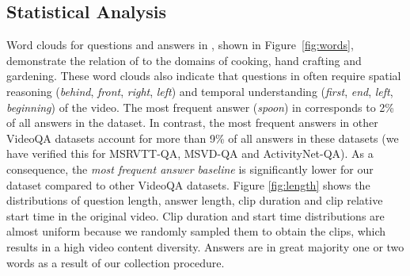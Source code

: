 \begin{table*}[t]
\centering
\setlength\tabcolsep{7pt}
\vspace{-0.3cm}
\caption{\small Results of our \textit{\vqat{}} model with different training strategies, on subsets of MSRVTT-QA, MSVD-QA and ActivityNet-QA, corresponding to four quartiles with Q1 and Q4 corresponding to samples with the most frequent and the least frequent answers, respectively.}
\vspace{-0.5cm}
\label{table:rareall}
\end{table*}


\subsection{Statistical Analysis}
Word clouds for questions and answers in \smalldatasetname{}, shown in Figure~\ref{fig:words}, demonstrate the relation of \smalldatasetname{} to the domains of cooking, hand crafting and gardening.
These word clouds also indicate that questions in \smalldatasetname{} often require spatial reasoning (\textit{behind}, \textit{front}, \textit{right}, \textit{left}) and temporal understanding (\textit{first}, \textit{end}, \textit{left}, \textit{beginning}) of the video. 
The most frequent answer (\textit{spoon}) in \smalldatasetname{} corresponds to 2\% of all answers in the dataset. 
In contrast, the most frequent answers in other VideoQA datasets account for more than 9\% of all answers in these datasets (we have verified this for MSRVTT-QA, MSVD-QA and ActivityNet-QA). 
As a consequence, the \textit{most frequent answer baseline} is significantly lower for our \smalldatasetname{} dataset compared to other VideoQA datasets.
Figure \ref{fig:length} shows the distributions of question length, answer length, clip duration and clip relative start time in the original video. Clip duration and start time distributions are almost uniform because we randomly sampled them to obtain the clips, which results in a high video content diversity.
Answers are in great majority one or two words as a result of our collection procedure.

